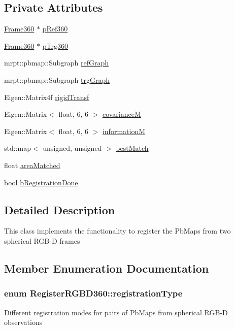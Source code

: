 \subsection*{Private Attributes}
\begin{DoxyCompactItemize}
\item 
\hyperlink{classFrame360}{Frame360} $\ast$ \hyperlink{classRegisterRGBD360_ad6545ecea17082a932f1d0b4484e6b0c}{p\-Ref360}
\item 
\hyperlink{classFrame360}{Frame360} $\ast$ \hyperlink{classRegisterRGBD360_a9ce56d7214d0f133c77f58fc3530e89a}{p\-Trg360}
\item 
mrpt\-::pbmap\-::\-Subgraph \hyperlink{classRegisterRGBD360_a203bdc0dc64df15f3ec48e43957c62fc}{ref\-Graph}
\item 
mrpt\-::pbmap\-::\-Subgraph \hyperlink{classRegisterRGBD360_ab91b2df6d1b7d557fc1a81278ecf15fa}{trg\-Graph}
\item 
Eigen\-::\-Matrix4f \hyperlink{classRegisterRGBD360_ac096bcae62d7e9db6dac8335a4f19e70}{rigid\-Transf}
\item 
Eigen\-::\-Matrix$<$ float, 6, 6 $>$ \hyperlink{classRegisterRGBD360_a8181c64807ede9dc94c357daa392d9b4}{covariance\-M}
\item 
Eigen\-::\-Matrix$<$ float, 6, 6 $>$ \hyperlink{classRegisterRGBD360_ad4eefda981429bfa865d1887ba11139c}{information\-M}
\item 
std\-::map$<$ unsigned, unsigned $>$ \hyperlink{classRegisterRGBD360_a9f73ec9a03579dd95f8228083ef73e86}{best\-Match}
\item 
float \hyperlink{classRegisterRGBD360_aa2ab5e4f34ecdfebd3eb10902086a04b}{area\-Matched}
\item 
bool \hyperlink{classRegisterRGBD360_ad2e72787086da0c82c3fb4f187aab10b}{b\-Registration\-Done}
\end{DoxyCompactItemize}


\subsection{Detailed Description}
This class implements the functionality to register the Pb\-Maps from two spherical R\-G\-B-\/\-D frames 

\subsection{Member Enumeration Documentation}
\hypertarget{classRegisterRGBD360_a919695c4544733673afeecdddd7f4937}{
\subsubsection[{registration\-Type}]{\setlength{\rightskip}{0pt plus 5cm}enum {\bf Register\-R\-G\-B\-D360\-::registration\-Type}}}\label{classRegisterRGBD360_a919695c4544733673afeecdddd7f4937}
Different registration modes for pairs of Pb\-Maps from spherical R\-G\-B-\/\-D observations 

